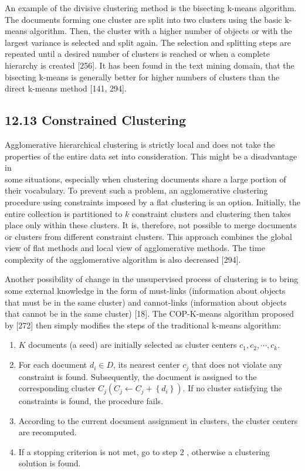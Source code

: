 \documentclass[10pt]{book}
\begin{document}
An example of the divisive clustering method is the bisecting k-means algorithm. The documents forming one cluster are split into two clusters using the basic k-means algorithm. Then, the cluster with a higher number of objects or with the largest variance is selected and split again. The selection and splitting steps are repeated until a desired number of clusters is reached or when a complete hierarchy is created [256]. It has been found in the text mining domain, that the bisecting k-means is generally better for higher numbers of clusters than the direct k-means method [141, 294].

\subsection*{12.13 Constrained Clustering}
Agglomerative hierarchical clustering is strictly local and does not take the properties of the entire data set into consideration. This might be a disadvantage in\\
some situations, especially when clustering documents share a large portion of their vocabulary. To prevent such a problem, an agglomerative clustering procedure using constraints imposed by a flat clustering is an option. Initially, the entire collection is partitioned to $k$ constraint clusters and clustering then takes place only within these clusters. It is, therefore, not possible to merge documents or clusters from different constraint clusters. This approach combines the global view of flat methods and local view of agglomerative methods. The time complexity of the agglomerative algorithm is also decreased [294].

Another possibility of change in the unsupervised process of clustering is to bring some external knowledge in the form of must-links (information about objects that must be in the same cluster) and cannot-links (information about objects that cannot be in the same cluster) [18]. The COP-K-means algorithm proposed by [272] then simply modifies the steps of the traditional k-means algorithm:

\begin{enumerate}
  \item $K$ documents (a seed) are initially selected as cluster centers $c_{1}, c_{2}, \cdots, c_{k}$.
  \item For each document $d_{i} \in D$, its nearest center $c_{j}$ that does not violate any constraint is found. Subsequently, the document is assigned to the corresponding cluster $C_{j}\left(C_{j} \leftarrow C_{j}+\left\{d_{i}\right\}\right)$. If no cluster satisfying the constraints is found, the procedure fails.
  \item According to the current document assignment in clusters, the cluster centers are recomputed.
  \item If a stopping criterion is not met, go to step 2 , otherwise a clustering solution is found.
\end{enumerate}
\end{document}
